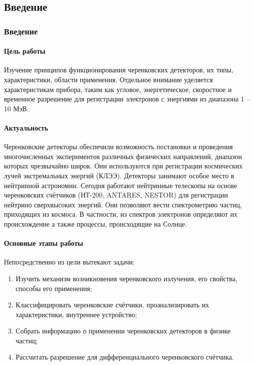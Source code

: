 \begin{Kur-Description}
	\fontsize{16}{14pt}\selectfont
	\newpage
	
	\part{Введение}
	\label{sec:part}
\section{Введение}
\label{sec:section}
\subsection{Цель работы}
\label{sec:subsection}
 Изучение принципов функционирования черенковских детекторов, их типы, характеристики, области применения. Отдельное внимание уделяется характеристикам прибора, таким как угловое, энергетическое, скоростное и временное разрешение для регистрации электронов с энергиями из диапазона 1 -- 10 МэВ. 

\subsection{Актуальность} 
\label{sec:subsection}
Черенковские детекторы обеспечили возможность постановки и проведения многочисленных экспериментов различных физических направлений, диапазон которых чрезвычайно широк. Они используются при регистрации космических лучей экстремальных энергий (КЛЭЭ). Детекторы занимают особое место в нейтринной астрономии. Сегодня работают нейтринные телескопы на основе черенковских счётчиков (НТ-200, ANTARES, NESTOR) для регистрации нейтрино сверхвысоких энергий. Они позволяют вести спектрометрию частиц, приходящих из космоса. В частности, из спектров электронов определяют их происхождение а также процессы, происходящие на Солнце.

\subsection{Основные этапы работы}
\label{sec:subsection}
Непосредственно из цели вытекают задачи:
\begin{enumerate}
	\item Изучить механизм возникновения черенковского излучения, его свойства, способы его применения;
	\item Классифицировать черенковские счётчики, проанализировать их характеристики, внутреннее устройство;
	\item Собрать информацию о применении черенковских детекторов в физике частиц;
	\item Рассчитать разрешение для дифференциального черенковского счётчика. 
\end{enumerate}
\end{Kur-Description}